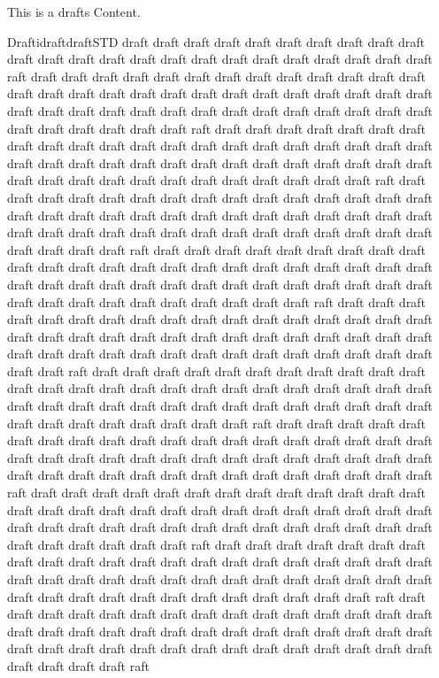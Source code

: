 \begin{MContent}
  This is a drafts Content.
\end{MContent}

\begin{MXContent}{Draftidraft}{draft}{STD}
 draft draft draft draft draft draft draft draft draft draft draft draft draft draft draft draft draft draft draft draft draft draft draft draft raft draft draft draft draft draft draft draft draft draft draft draft draft draft draft draft draft draft draft draft draft draft draft draft draft draft draft draft draft draft draft draft draft draft draft draft draft draft draft draft draft draft draft draft draft draft draft draft raft draft draft draft draft draft draft draft draft draft draft draft draft draft draft draft draft draft draft draft draft draft draft draft draft draft draft draft draft draft draft draft draft draft draft draft draft draft draft draft draft draft draft draft draft draft draft draft raft draft draft draft draft draft draft draft draft draft draft draft draft draft draft draft draft draft draft draft draft draft draft draft draft draft draft draft draft draft draft draft draft draft draft draft draft draft draft draft draft draft draft draft draft draft draft draft raft draft draft draft draft draft draft draft draft draft draft draft draft draft draft draft draft draft draft draft draft draft draft draft  draft draft draft draft draft draft draft draft draft draft draft draft draft draft draft draft draft draft draft draft draft draft draft draft raft draft draft draft draft draft draft draft draft draft draft draft draft draft draft draft draft draft draft draft draft draft draft draft draft draft draft draft draft draft draft draft draft draft draft draft draft draft draft draft draft draft draft draft draft draft draft draft raft draft draft draft draft draft draft draft draft draft draft draft draft draft draft draft draft draft draft draft draft draft draft draft draft draft draft draft draft draft draft draft draft draft draft draft draft draft draft draft draft draft draft draft draft draft draft draft raft draft draft draft draft draft draft draft draft draft draft draft draft draft draft draft draft draft draft draft draft draft draft draft draft draft draft draft draft draft draft draft draft draft draft draft draft draft draft draft draft draft draft draft draft draft draft draft raft draft draft draft draft draft draft draft draft draft draft draft draft draft draft draft draft draft draft draft draft draft draft draft  draft draft draft draft draft draft draft draft draft draft draft draft draft draft draft draft draft draft draft draft draft draft draft draft raft draft draft draft draft draft draft draft draft draft draft draft draft draft draft draft draft draft draft draft draft draft draft draft draft draft draft draft draft draft draft draft draft draft draft draft draft draft draft draft draft draft draft draft draft draft draft draft raft draft draft draft draft draft draft draft draft draft draft draft draft draft draft draft draft draft draft draft draft draft draft draft draft draft draft draft draft draft draft draft draft draft draft draft draft draft draft draft draft draft draft draft draft draft draft draft raft 
\end{MXContent}
